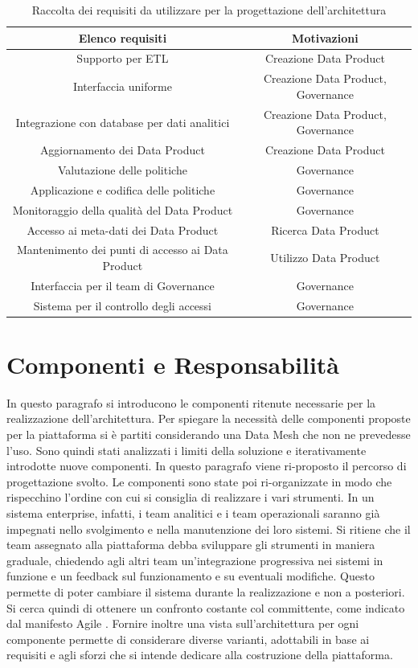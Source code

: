 \documentclass[12pt]{report}
\begin{document}
\begin{table}
    \centering
    \begin{tabular}{|c|c|}
    \hline
        Elenco requisiti & Motivazioni\\
        \hline
        Supporto per ETL & Creazione Data Product \\
        Interfaccia uniforme & Creazione Data Product, Governance\\
        Integrazione con database per dati analitici & Creazione Data Product, Governance \\
        Aggiornamento dei Data Product  & Creazione Data Product\\
        Valutazione delle politiche & Governance \\
        Applicazione e codifica delle politiche & Governance  \\
        Monitoraggio della qualità  del Data Product & Governance \\
        Accesso ai meta-dati dei Data Product & Ricerca Data Product \\
        Mantenimento dei punti di accesso ai Data Product & Utilizzo Data Product \\
        Interfaccia per il team di Governance & Governance \\
        Sistema per il controllo degli accessi & Governance \\
    \hline
    \end{tabular}
    \caption{Raccolta dei requisiti da utilizzare per la progettazione dell'architettura}
    \label{tab:requisitiTec}
\end{table}
\section{Componenti e Responsabilità}\label{componenti e responsabilità}
In questo paragrafo  si introducono le componenti ritenute necessarie per la realizzazione dell'architettura.
Per spiegare la necessità delle componenti proposte per la piattaforma si è partiti considerando una Data Mesh che non ne prevedesse l'uso. 
Sono quindi stati analizzati i limiti della soluzione e iterativamente introdotte nuove componenti.
In questo paragrafo viene ri-proposto il percorso di progettazione svolto.
Le componenti sono state poi ri-organizzate in modo che rispecchino l'ordine con cui si consiglia di realizzare i vari strumenti.
In un sistema enterprise, infatti, i team analitici e i team operazionali saranno già impegnati nello svolgimento e nella manutenzione dei loro sistemi.
Si ritiene che il team assegnato alla piattaforma debba sviluppare gli strumenti in maniera graduale, chiedendo agli altri team un'integrazione progressiva nei sistemi in funzione e un feedback sul funzionamento e su eventuali modifiche.
Questo permette di poter cambiare il sistema durante la realizzazione e non a posteriori.
Si cerca quindi di ottenere un confronto costante col committente, come indicato dal manifesto Agile \cite{fowler2001agile}.
Fornire inoltre una vista sull'architettura per ogni componente permette di considerare diverse varianti, adottabili in base ai requisiti e agli sforzi che si intende dedicare alla costruzione della piattaforma.
\end{document}

